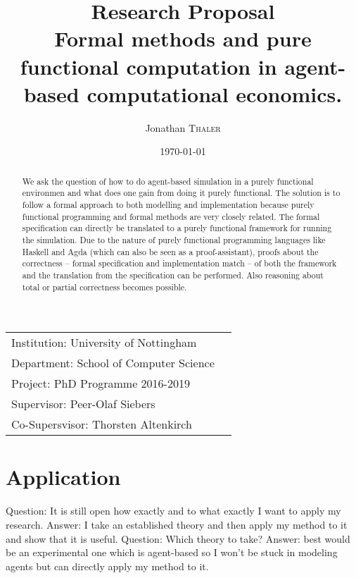 \documentclass{article}
\title{Research Proposal \\ Formal methods and pure functional computation in agent-based computational economics.} %
\author{Jonathan \textsc{Thaler}} %
\date{\today} %
\begin{document}
\maketitle %

\begin{center}
\begin{tabular}{l r}
Institution: University of Nottingham \\
Department: School of Computer Science \\
Project: PhD Programme 2016-2019 \\
Supervisor: Peer-Olaf Siebers \\
Co-Supersvisor: Thorsten Altenkirch 
\end{tabular}
\end{center}

\begin{abstract}
We ask the question of how to do agent-based simulation in a purely functional environmen and what does one gain from doing it purely functional. \linebreak
The solution is to follow a formal approach to both modelling and implementation because purely functional programming and formal methods are very closely related. The formal specification can directly be translated to a purely functional framework for running the simulation. Due to the nature of purely functional programming languages like Haskell and Agda (which can also be seen as a proof-assistant), proofs about the correctness – formal specification and implementation match – of both the framework and the translation from the specification can be performed. Also reasoning about total or partial correctness becomes possible.
\end{abstract}


\section{Application}
Question: It is still open how exactly and to what exactly I want to apply my research. Answer: I take an established theory and then apply my method to it and show that it is useful.
Question: Which theory to take? Answer: best would be an experimental one which is agent-based so I won’t be stuck in modeling agents but can directly apply my method to it.
\end{document}
